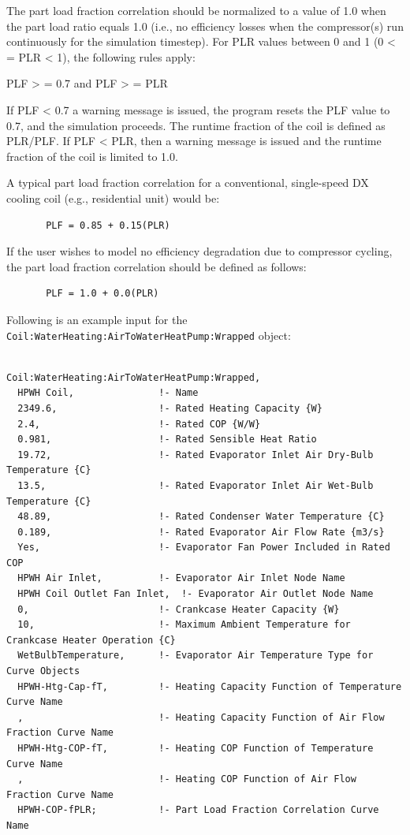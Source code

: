 The part load fraction correlation should be normalized to a value of 1.0 when the part load ratio equals 1.0 (i.e., no efficiency losses when the compressor(s) run continuously for the simulation timestep). For PLR values between 0 and 1 (0 \textless{} = PLR \textless{} 1), the following rules apply:

PLF \textgreater{} = 0.7 and PLF \textgreater{} = PLR

If PLF \textless{} 0.7 a warning message is issued, the program resets the PLF value to 0.7, and the simulation proceeds. The runtime fraction of the coil is defined as PLR/PLF. If PLF \textless{} PLR, then a warning message is issued and the runtime fraction of the coil is limited to 1.0.

A typical part load fraction correlation for a conventional, single-speed DX cooling coil (e.g., residential unit) would be:

\begin{lstlisting}
       PLF = 0.85 + 0.15(PLR)
\end{lstlisting}

If the user wishes to model no efficiency degradation due to compressor cycling, the part load fraction correlation should be defined as follows:

\begin{lstlisting}
       PLF = 1.0 + 0.0(PLR)
\end{lstlisting}

Following is an example input for the \lstinline!Coil:WaterHeating:AirToWaterHeatPump:Wrapped! object:

\begin{lstlisting}

Coil:WaterHeating:AirToWaterHeatPump:Wrapped,
  HPWH Coil,               !- Name
  2349.6,                  !- Rated Heating Capacity {W}
  2.4,                     !- Rated COP {W/W}
  0.981,                   !- Rated Sensible Heat Ratio
  19.72,                   !- Rated Evaporator Inlet Air Dry-Bulb Temperature {C}
  13.5,                    !- Rated Evaporator Inlet Air Wet-Bulb Temperature {C}
  48.89,                   !- Rated Condenser Water Temperature {C}
  0.189,                   !- Rated Evaporator Air Flow Rate {m3/s}
  Yes,                     !- Evaporator Fan Power Included in Rated COP
  HPWH Air Inlet,          !- Evaporator Air Inlet Node Name
  HPWH Coil Outlet Fan Inlet,  !- Evaporator Air Outlet Node Name
  0,                       !- Crankcase Heater Capacity {W}
  10,                      !- Maximum Ambient Temperature for Crankcase Heater Operation {C}
  WetBulbTemperature,      !- Evaporator Air Temperature Type for Curve Objects
  HPWH-Htg-Cap-fT,         !- Heating Capacity Function of Temperature Curve Name
  ,                        !- Heating Capacity Function of Air Flow Fraction Curve Name
  HPWH-Htg-COP-fT,         !- Heating COP Function of Temperature Curve Name
  ,                        !- Heating COP Function of Air Flow Fraction Curve Name
  HPWH-COP-fPLR;           !- Part Load Fraction Correlation Curve Name
\end{lstlisting}

